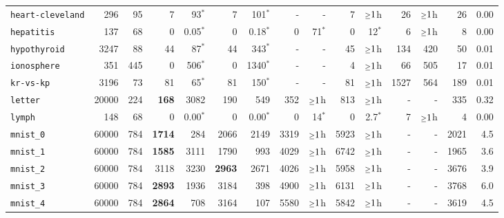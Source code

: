 \begin{tabular}{lccrrrrrrrrrrrr}
\texttt{heart-cleveland} & \multicolumn{1}{r}{296} & \multicolumn{1}{r}{95}  & 7 & 93$^*$ & 7 & 101$^*$ & - & - & 7 & $\mathsmaller{\geq}1$h & 26 & $\mathsmaller{\geq}1$h & 26 & 0.00\\
\texttt{hepatitis} & \multicolumn{1}{r}{137} & \multicolumn{1}{r}{68}  & 0 & 0.05$^*$ & 0 & 0.18$^*$ & 0 & 71$^*$ & 0 & 12$^*$ & 6 & $\mathsmaller{\geq}1$h & 8 & 0.00\\
\texttt{hypothyroid} & \multicolumn{1}{r}{3247} & \multicolumn{1}{r}{88}  & 44 & 87$^*$ & 44 & 343$^*$ & - & - & 45 & $\mathsmaller{\geq}1$h & 134 & 420 & 50 & 0.01\\
\texttt{ionosphere} & \multicolumn{1}{r}{351} & \multicolumn{1}{r}{445}  & 0 & 506$^*$ & 0 & 1340$^*$ & - & - & 4 & $\mathsmaller{\geq}1$h & 66 & 505 & 17 & 0.01\\
\texttt{kr-vs-kp} & \multicolumn{1}{r}{3196} & \multicolumn{1}{r}{73}  & 81 & 65$^*$ & 81 & 150$^*$ & - & - & 81 & $\mathsmaller{\geq}1$h & 1527 & 564 & 189 & 0.01\\
\texttt{letter} & \multicolumn{1}{r}{20000} & \multicolumn{1}{r}{224}  & \textbf{168} & 3082 & 190 & 549 & 352 & $\mathsmaller{\geq}1$h & 813 & $\mathsmaller{\geq}1$h & - & - & 335 & 0.32\\
\texttt{lymph} & \multicolumn{1}{r}{148} & \multicolumn{1}{r}{68}  & 0 & 0.00$^*$ & 0 & 0.00$^*$ & 0 & 14$^*$ & 0 & 2.7$^*$ & 7 & $\mathsmaller{\geq}1$h & 4 & 0.00\\
\texttt{mnist\_0} & \multicolumn{1}{r}{60000} & \multicolumn{1}{r}{784}  & \textbf{1714} & 284 & 2066 & 2149 & 3319 & $\mathsmaller{\geq}1$h & 5923 & $\mathsmaller{\geq}1$h & - & - & 2021 & 4.5\\
\texttt{mnist\_1} & \multicolumn{1}{r}{60000} & \multicolumn{1}{r}{784}  & \textbf{1585} & 3111 & 1790 & 993 & 4029 & $\mathsmaller{\geq}1$h & 6742 & $\mathsmaller{\geq}1$h & - & - & 1965 & 3.6\\
\texttt{mnist\_2} & \multicolumn{1}{r}{60000} & \multicolumn{1}{r}{784}  & 3118 & 3230 & \textbf{2963} & 2671 & 4026 & $\mathsmaller{\geq}1$h & 5958 & $\mathsmaller{\geq}1$h & - & - & 3676 & 3.9\\
\texttt{mnist\_3} & \multicolumn{1}{r}{60000} & \multicolumn{1}{r}{784}  & \textbf{2893} & 1936 & 3184 & 398 & 4900 & $\mathsmaller{\geq}1$h & 6131 & $\mathsmaller{\geq}1$h & - & - & 3768 & 6.0\\
\texttt{mnist\_4} & \multicolumn{1}{r}{60000} & \multicolumn{1}{r}{784}  & \textbf{2864} & 708 & 3164 & 107 & 5580 & $\mathsmaller{\geq}1$h & 5842 & $\mathsmaller{\geq}1$h & - & - & 3619 & 4.5\\

\end{tabular}
